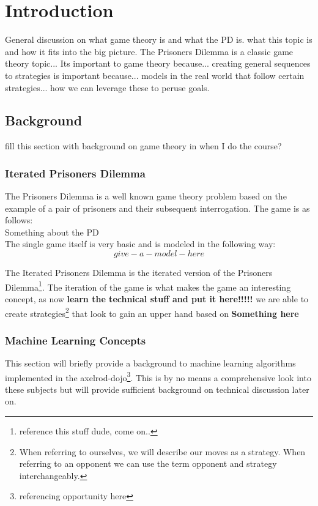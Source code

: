 
\chapter{Introduction}\label{ch:intro}

General discussion on what game theory is and what the PD is. what this topic is and how it fits into the big picture.
The Prisoners Dilemma is a classic game theory topic... Its important to game theory because... creating general sequences to strategies is important because... models in the real world that follow certain strategies... how we can leverage these to peruse goals.

    \section{Background}
        fill this section with background on game theory in when I do the course?
        \subsection{Iterated Prisoners Dilemma}\label{ssec:IPD}
        The Prisoners Dilemma is a well known game theory problem based on the example of a pair of prisoners and their subsequent interrogation. The game is as follows:\\ 

        Something about the PD \\ 

        The single game itself is very basic and is modeled in the following way: \\ 

        $$give-a-model-here$$

        The Iterated Prisoners Dilemma is the iterated version of the Prisoners Dilemma\footnote{reference this stuff dude, come on..}. The iteration of the game is what makes the game an interesting concept, as now \textbf{learn the technical stuff and put it here!!!!!} we are able to create strategies\footnote{When referring to ourselves, we will describe our moves as a strategy. When referring to an opponent we can use the term opponent and strategy interchangeably.} that look to gain an upper hand based on \textbf{Something here}

        
        \subsection{Machine Learning Concepts}
        This section will briefly provide a background to machine learning algorithms implemented in the axelrod-dojo\footnote{referencing opportunity here}. This is by no means a comprehensive look into these subjects but will provide sufficient background on technical discussion later on.
